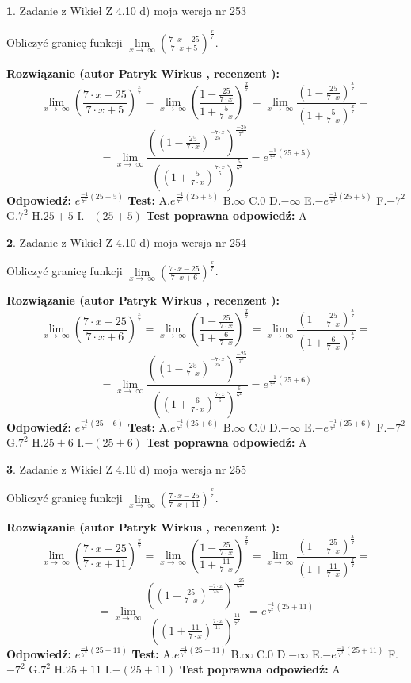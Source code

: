 \documentclass[12pt, a4paper]{article}
\theoremstyle{definition} %
\newtheorem{zad}{}
\newcommand{\zadStart}[1]{\begin{zad}#1\newline}
\newcommand{\zadStop}{\end{zad}}
\newcommand{\rozwStart}[2]{\noindent \textbf{Rozwiązanie (autor #1 , recenzent #2): }\newline}
\newcommand{\rozwStop}{\newline}
\newcommand{\odpStart}{\noindent \textbf{Odpowiedź:}\newline}
\newcommand{\odpStop}{\newline}
\newcommand{\testStart}{\noindent \textbf{Test:}\newline}
\newcommand{\testStop}{\newline}
\newcommand{\kluczStart}{\noindent \textbf{Test poprawna odpowiedź:}\newline}
\newcommand{\kluczStop}{\newline}
\begin{document}
\zadStart{Zadanie z Wikieł Z 4.10 d) moja wersja nr 253}


Obliczyć granicę funkcji  $\lim\limits_{x\to\ \infty}(\frac{7\cdot x-25}{7\cdot x+5})^{\frac{x}{7}}$.
\zadStop
\rozwStart{Patryk Wirkus}{}
$$\lim\limits_{x\to\ \infty}(\frac{7\cdot x-25}{7\cdot x+5})^{\frac{x}{7}} = \lim\limits_{x\to\ \infty}(\frac{1-\frac{25}{7\cdot x}}{1+\frac{5}{7\cdot x}})^{\frac{x}{7}}=\lim\limits_{x\to\ \infty}\frac{(1-\frac{25}{7\cdot x})^{\frac{x}{7}}}{(1+\frac{5}{7\cdot x})^{\frac{x}{7}}}=$$
$$=\lim\limits_{x\to\ \infty}\frac{((1-\frac{25}{7\cdot x})^{\frac{-7\cdot x}{25}})^{\frac{-25}{7^{2}}}}{((1+\frac{5}{7\cdot x})^{\frac{7\cdot x}{5}})^{\frac{5}{7^{2}}}}=e^{\frac{-1}{7^{2}}(25+5)}$$
\rozwStop
\odpStart
$e^{\frac{-1}{7^{2}}(25+5)}$
\odpStop
\testStart
A.$e^{\frac{-1}{7^{2}}(25+5)}$ B.$\infty$ C.$0$ D.$-\infty$ E.$-e^{\frac{-1}{7^{2}}(25+5)}$
F.$-7^{2}$ G.$7^{2}$
H.$25+5$
I.$-(25+5)$
\testStop
\kluczStart
A
\kluczStop



\zadStart{Zadanie z Wikieł Z 4.10 d) moja wersja nr 254}


Obliczyć granicę funkcji  $\lim\limits_{x\to\ \infty}(\frac{7\cdot x-25}{7\cdot x+6})^{\frac{x}{7}}$.
\zadStop
\rozwStart{Patryk Wirkus}{}
$$\lim\limits_{x\to\ \infty}(\frac{7\cdot x-25}{7\cdot x+6})^{\frac{x}{7}} = \lim\limits_{x\to\ \infty}(\frac{1-\frac{25}{7\cdot x}}{1+\frac{6}{7\cdot x}})^{\frac{x}{7}}=\lim\limits_{x\to\ \infty}\frac{(1-\frac{25}{7\cdot x})^{\frac{x}{7}}}{(1+\frac{6}{7\cdot x})^{\frac{x}{7}}}=$$
$$=\lim\limits_{x\to\ \infty}\frac{((1-\frac{25}{7\cdot x})^{\frac{-7\cdot x}{25}})^{\frac{-25}{7^{2}}}}{((1+\frac{6}{7\cdot x})^{\frac{7\cdot x}{6}})^{\frac{6}{7^{2}}}}=e^{\frac{-1}{7^{2}}(25+6)}$$
\rozwStop
\odpStart
$e^{\frac{-1}{7^{2}}(25+6)}$
\odpStop
\testStart
A.$e^{\frac{-1}{7^{2}}(25+6)}$ B.$\infty$ C.$0$ D.$-\infty$ E.$-e^{\frac{-1}{7^{2}}(25+6)}$
F.$-7^{2}$ G.$7^{2}$
H.$25+6$
I.$-(25+6)$
\testStop
\kluczStart
A
\kluczStop



\zadStart{Zadanie z Wikieł Z 4.10 d) moja wersja nr 255}


Obliczyć granicę funkcji  $\lim\limits_{x\to\ \infty}(\frac{7\cdot x-25}{7\cdot x+11})^{\frac{x}{7}}$.
\zadStop
\rozwStart{Patryk Wirkus}{}
$$\lim\limits_{x\to\ \infty}(\frac{7\cdot x-25}{7\cdot x+11})^{\frac{x}{7}} = \lim\limits_{x\to\ \infty}(\frac{1-\frac{25}{7\cdot x}}{1+\frac{11}{7\cdot x}})^{\frac{x}{7}}=\lim\limits_{x\to\ \infty}\frac{(1-\frac{25}{7\cdot x})^{\frac{x}{7}}}{(1+\frac{11}{7\cdot x})^{\frac{x}{7}}}=$$
$$=\lim\limits_{x\to\ \infty}\frac{((1-\frac{25}{7\cdot x})^{\frac{-7\cdot x}{25}})^{\frac{-25}{7^{2}}}}{((1+\frac{11}{7\cdot x})^{\frac{7\cdot x}{11}})^{\frac{11}{7^{2}}}}=e^{\frac{-1}{7^{2}}(25+11)}$$
\rozwStop
\odpStart
$e^{\frac{-1}{7^{2}}(25+11)}$
\odpStop
\testStart
A.$e^{\frac{-1}{7^{2}}(25+11)}$ B.$\infty$ C.$0$ D.$-\infty$ E.$-e^{\frac{-1}{7^{2}}(25+11)}$
F.$-7^{2}$ G.$7^{2}$
H.$25+11$
I.$-(25+11)$
\testStop
\kluczStart
A
\kluczStop
\end{document}
